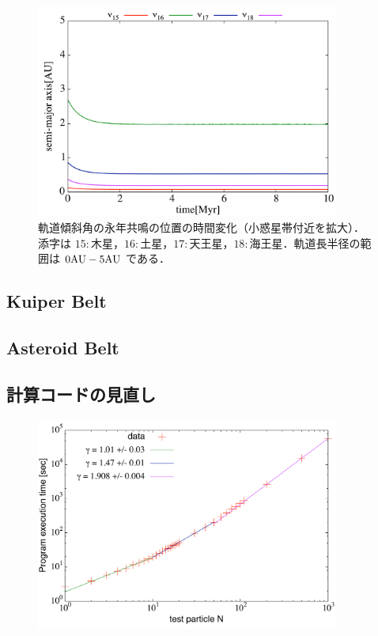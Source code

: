 \documentclass[11pt,a4paper,oneside,onecolumn]{jreport}
\begin{document}
\begin{figure}[H]
\centering
\includegraphics[width=10cm]{./image/SecularResonanceAxis_inc_upto5AU.pdf}
\caption{軌道傾斜角の永年共鳴の位置の時間変化（小惑星帯付近を拡大）．添字は $15 : 木星$，$16 : 土星$，$17 : 天王星$，$18 : 海王星$．軌道長半径の範囲は $0 {\rm AU} - 5 {\rm AU}$ である．\label{fig:SecularResonanceAxis_inc_upto5AU}}
\end{figure}


\subsection{Kuiper Belt}



\subsection{Asteroid Belt}









\subsection{計算コードの見直し}
\begin{figure}[H]
\centering
\includegraphics[width=10cm]{./image/Nbody_test.pdf}
\caption{\label{}}
\end{figure}
\end{document}
